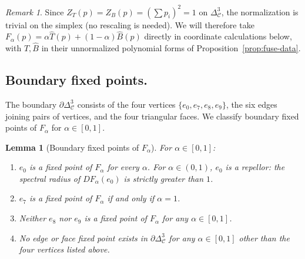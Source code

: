 \documentclass[11pt,reqno]{amsart}
\theoremstyle{plain}
\newtheorem{lemma}[theorem]{Lemma}
\theoremstyle{definition}
\theoremstyle{remark}
\newtheorem*{remark}{Remark}
\newcommand{\Cfour}{\mathcal{C}}
\newcommand{\Tfuse}{\widehat{T}}
\newcommand{\Bfuse}{\widehat{B}}
\begin{document}
\begin{remark}
Since $Z_{T}(p) = Z_{B}(p) = (\sum p_{i})^{2} = 1$ on
$\Delta^{3}_{\Cfour}$, the normalization is trivial on the
simplex (no rescaling is needed). We will therefore take
$F_{\alpha}(p) = \alpha\Tfuse(p) + (1-\alpha)\Bfuse(p)$ directly
in coordinate calculations below, with $\Tfuse, \Bfuse$ in their
unnormalized polynomial forms of
Proposition~\ref{prop:fuse-data}.
\end{remark}

\subsection{Boundary fixed points.} The boundary
$\partial\Delta^{3}_{\Cfour}$ consists of the four vertices
$\{e_{0}, e_{7}, e_{8}, e_{9}\}$, the six edges joining pairs of
vertices, and the four triangular faces. We classify boundary
fixed points of $F_{\alpha}$ for $\alpha\in[0,1]$.

\begin{lemma}[Boundary fixed points of $F_{\alpha}$]\label{lem:boundary}
For $\alpha\in[0, 1]$:
\begin{enumerate}\setlength\itemsep{0pt}
\item[(a)] $e_{0}$ is a fixed point of $F_{\alpha}$ for every
$\alpha$. For $\alpha\in(0, 1)$, $e_{0}$ is a repellor: the
spectral radius of $DF_{\alpha}(e_{0})$ is strictly greater
than $1$.
\item[(b)] $e_{7}$ is a fixed point of $F_{\alpha}$ if and only if
$\alpha = 1$.
\item[(c)] Neither $e_{8}$ nor $e_{9}$ is a fixed point of
$F_{\alpha}$ for any $\alpha\in[0,1]$.
\item[(d)] No edge or face fixed point exists in
$\partial\Delta^{3}_{\Cfour}$ for any $\alpha\in[0, 1]$ other
than the four vertices listed above.
\end{enumerate}
\end{lemma}
\end{document}
